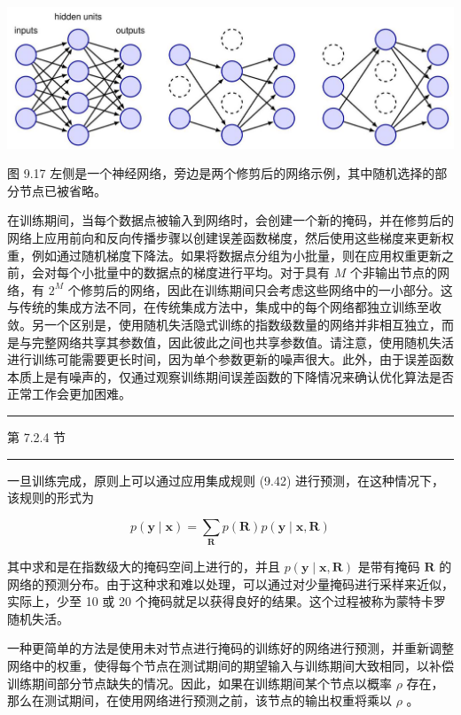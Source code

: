\documentclass[10pt]{article}
\newcommand{\HRule}{\begin{center}\rule{0.9\linewidth}{0.2mm}\end{center}}
\begin{document}
\begin{center}
\includegraphics[max width=1.0\textwidth]{images/0194e279-9b28-703a-88f4-c3ac21e2010d_299_212_349_1381_438_0.jpg}
\end{center}
\hspace*{3em} 

图 9.17 左侧是一个神经网络，旁边是两个修剪后的网络示例，其中随机选择的部分节点已被省略。

在训练期间，当每个数据点被输入到网络时，会创建一个新的掩码，并在修剪后的网络上应用前向和反向传播步骤以创建误差函数梯度，然后使用这些梯度来更新权重，例如通过随机梯度下降法。如果将数据点分组为小批量，则在应用权重更新之前，会对每个小批量中的数据点的梯度进行平均。对于具有 \(M\) 个非输出节点的网络，有 \({2}^{M}\) 个修剪后的网络，因此在训练期间只会考虑这些网络中的一小部分。这与传统的集成方法不同，在传统集成方法中，集成中的每个网络都独立训练至收敛。另一个区别是，使用随机失活隐式训练的指数级数量的网络并非相互独立，而是与完整网络共享其参数值，因此彼此之间也共享参数值。请注意，使用随机失活进行训练可能需要更长时间，因为单个参数更新的噪声很大。此外，由于误差函数本质上是有噪声的，仅通过观察训练期间误差函数的下降情况来确认优化算法是否正常工作会更加困难。

\HRule

第 7.2.4 节

\HRule

一旦训练完成，原则上可以通过应用集成规则 (9.42) 进行预测，在这种情况下，该规则的形式为

\[
p\left( {\mathbf{y} \mid  \mathbf{x}}\right)  = \mathop{\sum }\limits_{\mathbf{R}}p\left( \mathbf{R}\right) p\left( {\mathbf{y} \mid  \mathbf{x},\mathbf{R}}\right)  \tag{9.51}
\]

其中求和是在指数级大的掩码空间上进行的，并且 \(p\left( {\mathbf{y} \mid  \mathbf{x},\mathbf{R}}\right)\) 是带有掩码 \(\mathbf{R}\) 的网络的预测分布。由于这种求和难以处理，可以通过对少量掩码进行采样来近似，实际上，少至 10 或 20 个掩码就足以获得良好的结果。这个过程被称为蒙特卡罗随机失活。

一种更简单的方法是使用未对节点进行掩码的训练好的网络进行预测，并重新调整网络中的权重，使得每个节点在测试期间的期望输入与训练期间大致相同，以补偿训练期间部分节点缺失的情况。因此，如果在训练期间某个节点以概率 \(\rho\) 存在，那么在测试期间，在使用网络进行预测之前，该节点的输出权重将乘以 \(\rho\) 。
\end{document}
